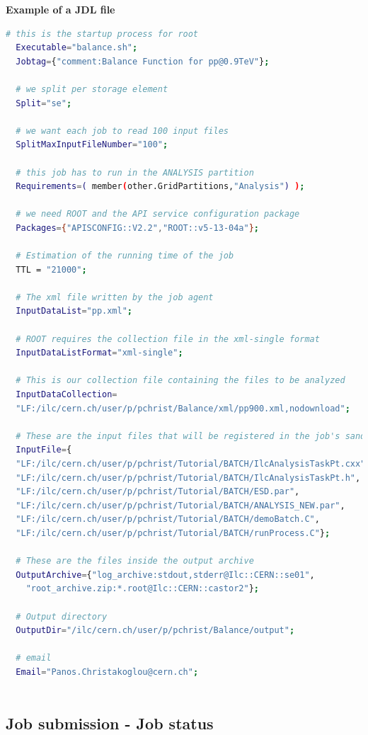 \vspace{0.5 cm}
\textbf{Example of a JDL file}
\begin{lstlisting}[language=bash]
  # this is the startup process for root
  Executable="balance.sh";
  Jobtag={"comment:Balance Function for pp@0.9TeV"};
  
  # we split per storage element
  Split="se";
  
  # we want each job to read 100 input files
  SplitMaxInputFileNumber="100";
  
  # this job has to run in the ANALYSIS partition
  Requirements=( member(other.GridPartitions,"Analysis") );
  
  # we need ROOT and the API service configuration package
  Packages={"APISCONFIG::V2.2","ROOT::v5-13-04a"};

  # Estimation of the running time of the job
  TTL = "21000";
  
  # The xml file written by the job agent
  InputDataList="pp.xml";
  
  # ROOT requires the collection file in the xml-single format
  InputDataListFormat="xml-single";
  
  # This is our collection file containing the files to be analyzed
  InputDataCollection=
  "LF:/ilc/cern.ch/user/p/pchrist/Balance/xml/pp900.xml,nodownload";
  
  # These are the input files that will be registered in the job's sandbox
  InputFile={
  "LF:/ilc/cern.ch/user/p/pchrist/Tutorial/BATCH/IlcAnalysisTaskPt.cxx",
  "LF:/ilc/cern.ch/user/p/pchrist/Tutorial/BATCH/IlcAnalysisTaskPt.h",
  "LF:/ilc/cern.ch/user/p/pchrist/Tutorial/BATCH/ESD.par", 
  "LF:/ilc/cern.ch/user/p/pchrist/Tutorial/BATCH/ANALYSIS_NEW.par", 
  "LF:/ilc/cern.ch/user/p/pchrist/Tutorial/BATCH/demoBatch.C",
  "LF:/ilc/cern.ch/user/p/pchrist/Tutorial/BATCH/runProcess.C"};
  
  # These are the files inside the output archive
  OutputArchive={"log_archive:stdout,stderr@Ilc::CERN::se01",
    "root_archive.zip:*.root@Ilc::CERN::castor2"};
  
  # Output directory
  OutputDir="/ilc/cern.ch/user/p/pchrist/Balance/output";
  
  # email
  Email="Panos.Christakoglou@cern.ch";
  
\end{lstlisting}


\subsection{Job submission - Job status}

